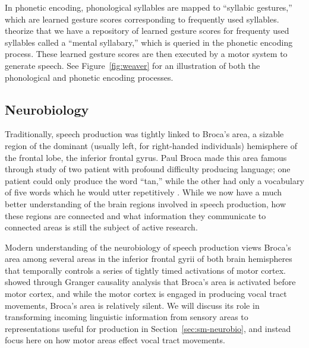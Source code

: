 In phonetic encoding,
phonological syllables are
mapped to ``syllabic gestures,''
which are learned gesture scores
corresponding to frequently used syllables.
\citet{levelt1992,levelt1994} theorize
that we have a repository
of learned gesture scores
for frequenty used syllables
called a ``mental syllabary,''
which is queried
in the phonetic encoding process.
These learned gesture scores
are then executed by a motor system
to generate speech.
See Figure~\ref{fig:weaver}
for an illustration of both
the phonological
and phonetic encoding processes.


\subsection{Neurobiology}
\label{sec:prod-neurobio}

Traditionally, speech production
was tightly linked to Broca's area,
a sizable region of the dominant
(usually left, for right-handed individuals)
hemisphere of the frontal lobe,
the inferior frontal gyrus.
Paul Broca made this area famous
through study of two patient
with profound difficulty producing language;
one patient could only produce the word ``tan,''
while the other had only a vocabulary
of five words which he would utter repetitively
\citep{broca1861}.
While we now have a much better understanding
of the brain regions
involved in speech production,
how these regions are connected
and what information they communicate
to connected areas is still
the subject of active research.

Modern understanding of
the neurobiology of speech production
views Broca's area among several
areas in the inferior frontal gyrii
of both brain hemispheres
that temporally controls a series
of tightly timed activations
of motor cortex.
\citet{flinker2015}
showed through Granger causality analysis
that Broca's area is activated
before motor cortex,
and while the motor cortex is
engaged in producing vocal tract movements,
Broca's area is relatively silent.
We will discuss its role in
transforming incoming linguistic
information from sensory areas
to representations useful for production
in Section~\ref{sec:sm-neurobio},
and instead focus here on
how motor areas effect vocal tract movements.

